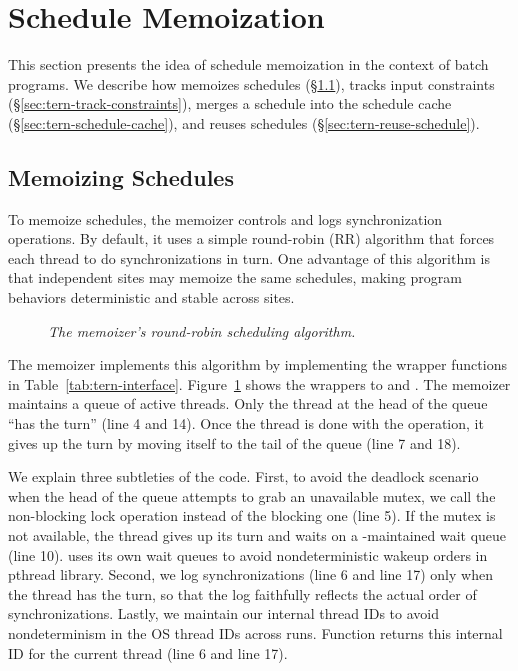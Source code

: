 \section{Schedule Memoization}  \label{sec:tern-batch}

This section presents the idea of schedule memoization in the context of
batch programs.  We describe how \tern memoizes schedules
(\S\ref{sec:tern-derive-schedule}), tracks input constraints
(\S\ref{sec:tern-track-constraints}), merges a schedule into the schedule cache
(\S\ref{sec:tern-schedule-cache}), and reuses schedules
(\S\ref{sec:tern-reuse-schedule}).

\subsection{Memoizing Schedules}  \label{sec:tern-derive-schedule}

To memoize schedules, the memoizer controls and logs synchronization
operations. By default, it uses a simple round-robin (RR) algorithm that
forces each thread to do synchronizations in turn.  One advantage of this
algorithm is that independent sites may memoize the same schedules, making
program behaviors deterministic and stable across sites.

\begin{figure}[t]
\caption{\small \emph{The memoizer's round-robin scheduling algorithm.}}
\label{fig:tern-memoizer}
\end{figure}

The memoizer implements this algorithm by implementing the wrapper
functions in Table~\ref{tab:tern-interface}.  Figure~\ref{fig:tern-memoizer} shows
the wrappers to  and
.  The memoizer maintains a queue of active
threads.  Only the thread at the head of the queue ``has the turn'' (line
4 and 14).  Once the thread is done with the operation, it gives up the
turn by moving itself to the tail of the queue (line 7 and 18).

We explain three subtleties of the code.  First, to avoid the deadlock
scenario when the head of the queue attempts to grab an unavailable mutex,
we call the non-blocking lock operation instead of the blocking one (line
5).  If the mutex is not available, the thread gives up its turn and waits
on a \tern-maintained wait queue (line 10).  \tern uses its own wait queues
to avoid nondeterministic wakeup orders in pthread library.  Second, we
log synchronizations (line 6 and line 17) only when the thread has the turn, so
that the log faithfully reflects the actual order of synchronizations.
Lastly, we maintain our internal thread IDs to avoid nondeterminism in the
OS thread IDs across runs.  Function  returns this internal ID
for the current thread (line 6 and line 17).

